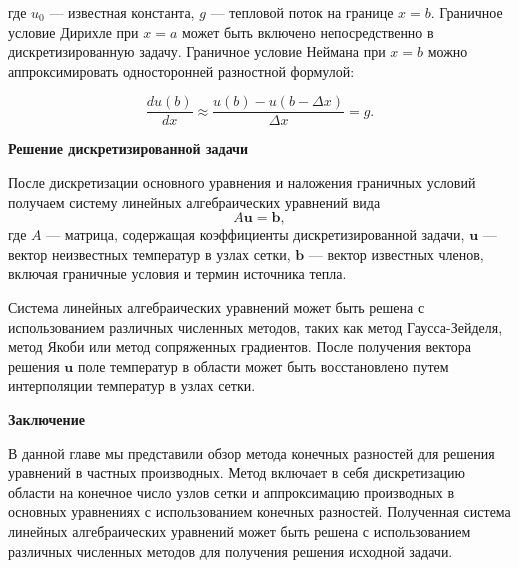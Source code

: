 где $u_0$ — известная константа,
$g$ — тепловой поток на границе $x = b$.
Граничное условие Дирихле при $x = a$ может быть
включено непосредственно в дискретизированную задачу.
Граничное условие Неймана при $x = b$ можно аппроксимировать
односторонней разностной формулой:

\begin{equation*}
\frac{du(b)}{dx} \approx \frac{u(b) - u(b - \Delta x)}{\Delta x} = g.
\end{equation*}

\textbf{Решение дискретизированной задачи}

После дискретизации основного уравнения и наложения граничных
условий получаем систему линейных алгебраических уравнений вида
\begin{equation*}
A\mathbf{u} = \mathbf{b},
\end{equation*}
где $A$ — матрица, содержащая коэффициенты дискретизированной
задачи, $\mathbf{u}$ — вектор неизвестных температур в узлах сетки,
$\mathbf{b}$ — вектор известных членов, включая граничные
условия и термин источника тепла.

Система линейных алгебраических уравнений может быть решена с
использованием различных численных методов, таких как метод
Гаусса-Зейделя, метод Якоби или метод сопряженных градиентов.
После получения вектора решения $\mathbf{u}$ поле температур в
области может быть восстановлено путем интерполяции температур в узлах сетки.

\textbf{Заключение}

В данной главе мы представили обзор метода конечных разностей
для решения уравнений в частных производных.
Метод включает в себя дискретизацию области на конечное число
узлов сетки и аппроксимацию производных в основных уравнениях
с использованием конечных разностей.
Полученная система линейных
алгебраических уравнений может быть решена с использованием различных
численных методов для получения решения исходной задачи.
